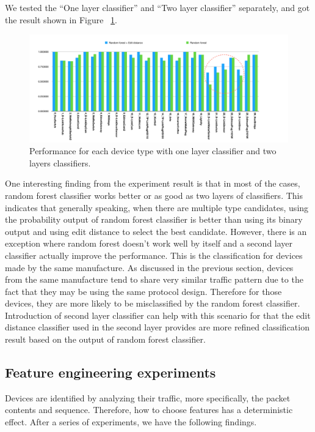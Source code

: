 \documentclass[twocolumn,10pt]{article}
\begin{document}
We tested the “One layer classifier” and “Two layer classifier” separately, and got the result shown in Figure ~\ref{fig: res1}.


\begin{figure}[h]
  \centering
   \includegraphics[scale=0.3]{res1}
  \caption{Performance for each device type with one layer classifier and two layers classifiers.}
  \label{fig: res1}
\end{figure}

One interesting finding from the experiment result is that in most of the cases, random forest classifier works better or as good as two layers of classifiers. This indicates that generally speaking, when there are multiple type candidates, using the probability output of random forest classifier is better than using its binary output and using edit distance to select the best candidate. However, there is an exception where random forest doesn’t work well by itself and a second layer classifier actually improve the performance. This is the classification for devices made by the same manufacture. As discussed in the previous section, devices from the same manufacture tend to share very similar traffic pattern due to the fact that they may be using the same protocol design. Therefore for those devices, they are more likely to be misclassified by the random forest classifier. Introduction of second layer classifier can help with this scenario for that the edit distance classifier used in the second layer provides are more refined classification result based on the output of random forest classifier. 

\subsection{Feature engineering experiments}

Devices are identified by analyzing their traffic, more specifically, the packet contents and sequence. Therefore, how to choose features has a deterministic effect. After a series of experiments, we have the following findings.
\end{document}
